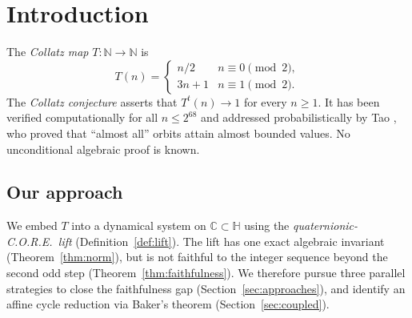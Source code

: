 \documentclass[12pt,reqno]{amsart}
\theoremstyle{plain}
\theoremstyle{definition}
\theoremstyle{remark}
\newcommand{\HH}{\mathbb{H}}
\newcommand{\CC}{\mathbb{C}}
\newcommand{\NN}{\mathbb{N}}
\newcommand{\Tmap}{T}          %
\begin{document}
\begin{abstract}
\medskip
\noindent\textbf{Empirical validation.}  We verify Collatz convergence for all
$n \leq 10^9$ via an optimised multi-core integer algorithm
($\approx 60$ minutes, two cores).  For all $n \leq 10^5$ in the
quaternionic verifier, the converged set is \emph{exactly} the powers of two
and no orbit returns to its starting point---supporting Conjecture~\ref{conj:cycle}.

\medskip
\noindent
We make no claim of a complete proof of the Collatz conjecture.
The framework is offered as a new algebraic toolkit for the problem,
with three open problems stated precisely in Section~\ref{sec:open}.
\end{abstract}

\maketitle
\tableofcontents

\section{Introduction}
\label{sec:intro}

The \emph{Collatz map} $\Tmap : \NN \to \NN$ is
\[
  \Tmap(n) = \begin{cases} n/2 & n \equiv 0\!\pmod{2}, \\
  3n+1 & n \equiv 1\!\pmod{2}. \end{cases}
\]
The \emph{Collatz conjecture} asserts that $\Tmap^t(n) \to 1$ for every
$n \geq 1$.  It has been verified computationally for all $n \leq 2^{68}$
\cite{Oliveira2010} and addressed probabilistically by Tao \cite{Tao2022},
who proved that ``almost all'' orbits attain almost bounded values.
No unconditional algebraic proof is known.

\subsection{Our approach}
We embed $\Tmap$ into a dynamical system on $\CC \subset \HH$ using the
\emph{quaternionic-C.O.R.E.\ lift} (Definition~\ref{def:lift}).  The lift has
one exact algebraic invariant (Theorem~\ref{thm:norm}), but is not
faithful to the integer sequence beyond the second odd step
(Theorem~\ref{thm:faithfulness}).  We therefore pursue three parallel
strategies to close the faithfulness gap (Section~\ref{sec:approaches}),
and identify an affine cycle reduction via Baker's theorem
(Section~\ref{sec:coupled}).
\end{document}
